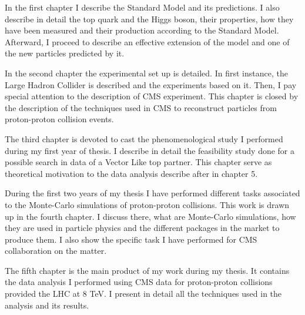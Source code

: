 In the first chapter I describe the Standard Model and its predictions. I also describe in detail the top quark and the Higgs boson, their properties, how they have been measured and their production according to the Standard Model. Afterward, I proceed to describe an effective extension of the model and one of the new particles predicted by it. 

In the second chapter the experimental set up is detailed. In first instance, the Large Hadron Collider is described and the experiments based on it. Then, I pay special attention to the description of CMS experiment. This chapter is closed by the description of the techniques used in CMS to reconstruct particles from proton-proton collision events. 

The third chapter is devoted to cast the phenomenological study I performed during my first year of thesis. I describe in detail the feasibility study done for a possible search in data of a Vector Like top partner. This chapter serve as theoretical motivation to the data analysis describe after in chapter 5.

During the first two years of my thesis I have performed different tasks associated to the Monte-Carlo simulations of proton-proton collisions. This work is drawn up in the fourth chapter. I discuss there, what are Monte-Carlo simulations, how they are used in particle physics and the different packages in the market to produce them. I also show the specific task I have performed for CMS collaboration on the matter.

The fifth chapter is the main product of my work during my thesis. It contains the data analysis I performed using CMS data for proton-proton collisions provided the LHC at 8 TeV. I present in detail all the techniques used in the analysis and its results.